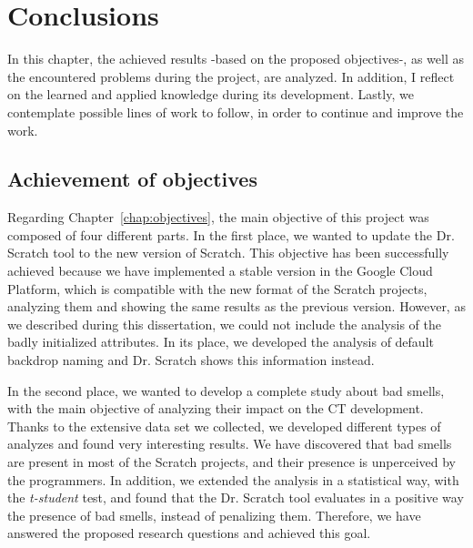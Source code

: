 

\cleardoublepage
\chapter{Conclusions}
\label{chap:conclusions}

In this chapter, the achieved results -based on the proposed objectives-, as well as the encountered problems during the project, are analyzed. In addition, I reflect on the learned and applied knowledge during its development. Lastly, we contemplate possible lines of work to follow, in order to continue and improve the work. 


\section{Achievement of objectives}
\label{sec:achievement_objectives}

Regarding Chapter~\ref{chap:objectives}, the main objective of this project was composed of four different parts. In the first place, we wanted to update the Dr. Scratch tool to the new version of Scratch. This objective has been successfully achieved because we have implemented a stable version in the Google Cloud Platform, which is compatible with the new format of the Scratch projects, analyzing them and showing the same results as the previous version. However, as we described during this dissertation, we could not include the analysis of the badly initialized attributes. In its place, we developed the analysis of default backdrop naming and Dr. Scratch shows this information instead.

In the second place, we wanted to develop a complete study about bad smells, with the main objective of analyzing their impact on the CT development. Thanks to the extensive data set we collected, we developed different types of analyzes and found very interesting results. We have discovered that bad smells are present in most of the Scratch projects, and their presence is unperceived by the programmers. In addition, we extended the analysis in a statistical way, with the \textit{t-student} test, and found that the Dr. Scratch tool evaluates in a positive way the presence of bad smells, instead of penalizing them. Therefore, we have answered the proposed research questions and achieved this goal.

